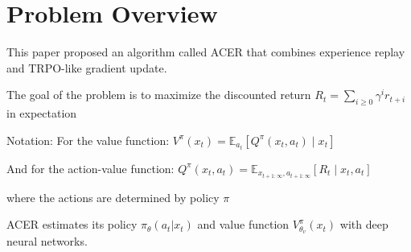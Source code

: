 \section{Problem Overview}
\label{section:intro}
This paper proposed an algorithm called ACER that combines experience replay and TRPO-like gradient update.


The goal of the problem is to maximize the discounted return $R_t = \sum_{i \ge 0}{\gamma^i r_{t+i}}$ in expectation 

Notation:
For the value function:
$V^{\pi}\left(x_{t}\right)=\mathbb{E}_{a_{t}}\left[Q^{\pi}\left(x_{t}, a_{t}\right) \mid x_{t}\right]$

And for the action-value function:
$Q^{\pi}\left(x_{t}, a_{t}\right)=\mathbb{E}_{x_{t+1: \infty}, a_{t+1: \infty}}\left[R_{t} \mid x_{t}, a_{t}\right]$

where the actions are determined by policy $\pi$

ACER estimates its policy $\pi_{\theta}(a_t | x_t)$ and value function $V^\pi_{\theta_v}(x_t)$ with deep neural networks.






